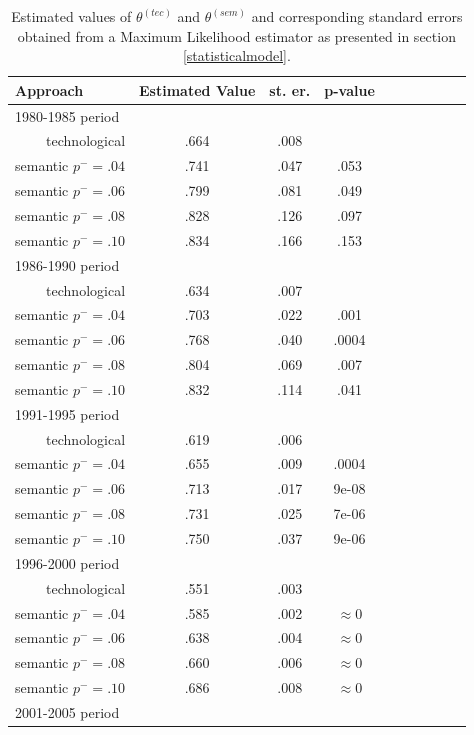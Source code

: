 \documentclass[article]{article}%
\begin{document}
\begin{table}[!ht]
\centering
\caption{\label{summary} Estimated values of $\theta^{(tec)}$ and $\theta^{(sem)}$ and corresponding standard errors obtained from a Maximum Likelihood estimator as presented in section \ref{statisticalmodel}.}
\label{stdQMLE}
\begin{tabular}{@{}rccccccccc@{}}
\toprule
\toprule
\multicolumn{1}{l}{Approach} & \multicolumn{1}{l}{Estimated Value} & \multicolumn{1}{l}{st. er.} & \multicolumn{1}{l}{p-value} \\ \toprule
\multicolumn{4}{l}{1980-1985 period} \\
technological & .664 &.008&\\
semantic $p^{-} = .04$ & .741 &.047 & .053\\
semantic $p^{-} = .06$ & .799 &.081 & .049\\
semantic $p^{-} = .08$ & .828 &.126 & .097\\
semantic $p^{-} = .10$ & .834 &.166 & .153\\
\multicolumn{4}{l}{1986-1990 period} \\
technological & .634 &.007&\\
semantic $p^{-} = .04$ & .703 &.022 & .001\\
semantic $p^{-} = .06$ & .768 &.040 & .0004\\
semantic $p^{-} = .08$ & .804 &.069 & .007\\
semantic $p^{-} = .10$ & .832 &.114 & .041\\
\multicolumn{4}{l}{1991-1995 period} \\
technological & .619 &.006&\\
semantic $p^{-} = .04$ & .655 &.009 & .0004\\
semantic $p^{-} = .06$ & .713 &.017 & 9e-08\\
semantic $p^{-} = .08$ & .731 &.025 & 7e-06\\
semantic $p^{-} = .10$ & .750 &.037 & 9e-06\\
\multicolumn{4}{l}{1996-2000 period} \\
technological & .551 &.003&\\
semantic $p^{-} = .04$ & .585 &.002 & $\approx 0$\\
semantic $p^{-} = .06$ & .638 &.004 & $\approx 0$\\
semantic $p^{-} = .08$ & .660 &.006 & $\approx 0$\\
semantic $p^{-} = .10$ & .686 &.008 & $\approx 0$\\
\multicolumn{4}{l}{2001-2005 period} \\

\end{tabular}
\end{table}
\end{document}
